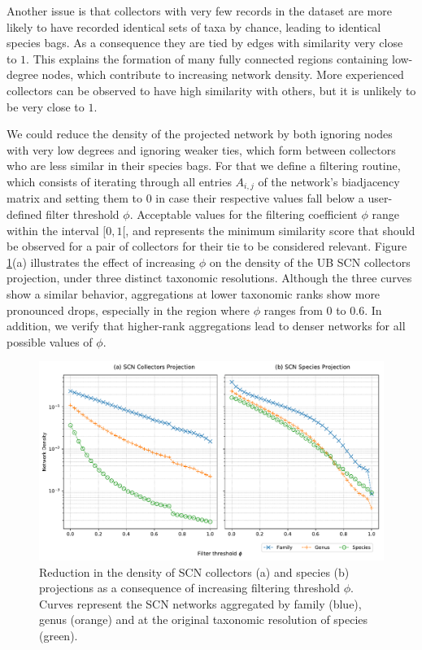 Another issue is that collectors with very few records in the dataset are more likely to have recorded identical sets of taxa by chance, leading to identical species bags.
As a consequence they are tied by edges with similarity very close to $1$.
This explains the formation of many fully connected regions containing low-degree nodes, which contribute to increasing network density.
More experienced collectors can be observed to have high similarity with others, but it is unlikely to be very close to $1$.

We could reduce the density of the projected network by both ignoring nodes with very low degrees and ignoring weaker ties, which form between collectors who are less similar in their species bags.
For that we define a filtering routine, which consists of iterating through all entries $A_{i,j}$ of the network's biadjacency matrix and setting them to $0$ in case their respective values fall below a user-defined filter threshold $\phi$.
Acceptable values for the filtering coefficient $\phi$ range within the interval $[0,1[$, and represents the minimum similarity score that should be observed for a pair of collectors for their tie to be considered relevant.
Figure \ref{fig:ub_scn_filter_thresh}(a) illustrates the effect of increasing $\phi$ on the density of the UB SCN collectors projection, under three distinct taxonomic resolutions.
Although the three curves show a similar behavior, aggregations at lower taxonomic ranks show more pronounced drops, especially in the region where $\phi$ ranges from $0$ to $0.6$.
In addition, we verify that higher-rank aggregations lead to denser networks for all possible values of $\phi$.

\begin{figure}[!ht]
  	\centering
    \includegraphics[width=\linewidth]{figures/casestudy_ub/scn_filter_thresh.pdf}
    \caption{ Reduction in the density of SCN collectors (a) and species (b) projections as a consequence of increasing filtering threshold $\phi$. Curves represent the SCN networks aggregated by family (blue), genus (orange) and at the original taxonomic resolution of species (green). }
    \label{fig:ub_scn_filter_thresh}
\end{figure}


